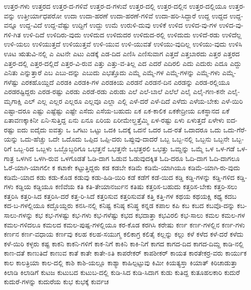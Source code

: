 {ಉತ್ತರ-ಗಳು
ಉತ್ತರದ
ಉತ್ತರ-ದ-ಗಳಿವೆ
ಉತ್ತರ-ದ-ಗಳುವೆ
ಉತ್ತರ-ದಲ್ಲಿ
ಉತ್ತರ-ದಲ್ಲಿನ
ಉತ್ತರ-ದಲ್ಲಿಯೂ
ಉತ್ತರ-ವನ್ನು
ಉತ್ತೀರ್ಯಾಧಪರೋ
ಉದಾ
ಉದಾ-ಹರಣೆ
ಉದಾ-ಹರಣೆ-ಗಳಿವೆ
ಉದಾ-ಹರಿ-ಸಿದ್ದಾರೆ
ಉದ್ದ
ಉದ್ದದ
ಉದ್ದ-ವನ್ನೂ
ಉದ್ದ-ವಿದೆ
ಉದ್ದ-ವೆಷ್ಟು
ಉದ್ದಿಗೆ
ಉದ್ದು
ಉಮೆ
ಉರುಳಿ-ದುವು
ಉಳಿಕೆ
ಉಳಿದ
ಉಳಿದ-ವು-ಗಳ
ಉಳಿದ-ವು-ಗಳಿ-ಗಿತ
ಉಳಿ-ದಿದೆ
ಉಳಿದಿರು-ವುದು
ಉಳಿದುದ
ಉಳಿದುದರ
ಉಳಿದುದ-ರಲ್ಲಿ
ಉಳಿದುದು
ಉಳಿದೆ-ರಡು
ಉಳಿದೆಲ್ಲ
ಉಳಿ-ಯಲು
ಉಳಿಯುತ್ತದೆ
ಉಳಿಯುತ್ತವೆ
ಉಳಿ-ಯುವ
ಉಳಿ-ಯುವತೆ
ಉಳಿಯು-ವುದಿಲ್ಲ
ಉಳಿಯು-ವುದು
ಉಳಿಸಿ
ಊಟ
ಋತುವಿ-ನಲ್ಲಿ
ಎ
ಎಟನೇ
ಎಟು
ಎಡಕ್ಕೆ
ಎಡ-ದಿದ
ಎಣಿಸಿ
ಎಣಿಸುವಾಗ
ಎತ್ತದೆ
ಎತ್ತಬಾರದು
ಎತ್ತರ
ಎತ್ತರದ
ಎತ್ತರ-ದಲ್ಲಿ
ಎತ್ತರ-ದಲ್ಲಿದೆ
ಎತ್ತರ-ವಿ-ರುವ
ಎತ್ತು
ಎತ್ತು-ವ-ತಿಲ್ಲ
ಎದ
ಎದರೆ
ಎದಿರಲಿ
ಎದು
ಎದುರು
ಎದೂ
ಎದ್ದು
ಎನಿತು
ಎನ್ನುತ್ತಾರೆ
ಎಬ
ಎಬು-ದನ್ನು
ಎಬುದು
ಎಭತ್ತೊದು
ಎಮ್ಮೆ
ಎಮ್ಮೆ-ಗಳ
ಎಮ್ಮೆ-ಗಳನ್ನು
ಎಮ್ಮೆ-ಗಳು
ಎಮ್ಮೆ-ಗಳೆಷ್ಟು
ಎರಕಹೊಯ್ದಿದೆ
ಎರಡಕಿ
ಎರಡಕಿ-ಗಳ
ಎರಡಕಿಯ
ಎರಡನೆ
ಎರಡನೆ-ದಿನ
ಎರಡನ್ನು
ಎರಡ-ರಲ್ಲಿಯೂ
ಎರಡರಷ್ಟಿದ್ದರು
ಎರಡ-ರಷ್ಟು
ಎರಡು
ಎರಡೆ-ರಡು
ಎರುಡು
ಎಲೆ
ಎಲೆ-ಬಾಲೆ
ಎಲೆಲೆ
ಎಲೈ
ಎಲೈ-ಗಣ-ಕನೇ
ಎಲೈ-ಮೃಗಾಕ್ಷಿ
ಎಲ್
ಎಲ್ಲ
ಎಲ್ಲರ
ಎಲ್ಲರೂ
ಎಲ್ಲವೂ
ಎಲ್ಲಾ
ಎಲ್ಲಿ
ಎಳೆ-ದರೆ
ಎಳೆ-ದಿದೆ
ಎಳೆದು
ಎಳೆಯ-ಬೇಕು
ಎಳೆ-ಯಿರಿ
ಎಷ್ಟಾ-ದರೂ
ಎಷ್ಟು
ಎಷ್ಟೆಷ್ಟು
ಎಷ್ಟೇ
ಎಸೆದು
ಎಸೆಯ-ಬಹುದು
ಏಕ
ಏಕ-ಕಾಲಿಕ
ಏಕಕೇದ್ರೀಯ
ಏಕಸ್ಥಾನದ
ಏಕೆ
ಏತಾವಣಕ್ಕಾಕಿನೀ
ಏನಿ-ಸುತ್ತಿದ್ದ
ಏನು
ಏನೂ
ಏರಿಯ
ಏರೀಮೇಲ್ಹತ್ತೆಮ್ಮಿ
ಏಳ-ರಷ್ಟು
ಏಳು
ಏಳುತ್ತದೆ
ಏಳೇಳು
ಐದ-ರಷ್ಟು
ಐದು
ಐದೈದು
ಐವತ್ತು
ಒ
ಒಗಟು
ಒಟ್ಟು
ಒದಕಿ
ಒದಕ್ಕೆ
ಒದನೆ
ಒದರ
ಒದ-ರತೆ
ಒದಾದರೂ
ಒದು
ಒದು-ಗೆರೆ-ಯನ್ನು
ಒದು-ಹೆಚ್ಚು
ಒದೇ
ಒದೊದು
ಒಪ್ಪಿದ
ಒಪ್ಪಿ-ದರು
ಒಪ್ಪುವು-ದಾದರೆ
ಒಬ್ಬ
ಒಬ್ಬ-ನಲ್ಲಿ
ಒಬ್ಬನು
ಒಬ್ಬನೇ
ಒಬ್ಬ-ರಿಗೆ
ಒಬ್ಬ-ರಿದ
ಒಬ್ಬಳು
ಒಬ್ಬೊಬ್ಬರಿಗೂ
ಒಭತ್ತನೆ
ಒಭತ್ತನೇ
ಒಭತ್ತರಲಿ
ಒಭತ್ತು
ಒಮ್ದನ್ನು
ಒಮ್ಮೆ
ಒಳ
ಒಳ-ಗಡೆ
ಒಳ-ಗಾತ್ರ
ಒಳಗಿನ
ಒಳಗಿ-ರುವ
ಒಳಗೊಡತೆ
ಓಡಿ-ದಾಗ
ಓಡುವ
ಓಡುವುದಕ್ಕಿತ
ಓದಿ-ದರೂ
ಓದಿ-ದಾಗ
ಓದಿ-ದಾಗಲೂ
ಓರೆ-ಯಾಗಿ-ಯಾಗಲೀ
ಕ
ಕಟಾಕೇ
ಕಟ್ಟುತ್ತಿದ್ದರು
ಕಡ
ಕಡಬೇ
ಕಡಿಮೆ
ಕಡಿಮೆ-ಯಾಗಿಯೂ
ಕಡಿಮೆ-ಯಾಗಿ-ರು-ವುದು
ಕಡಿಮೆ-ಯಾದ
ಕಡು
ಕಡು-ಕೊಡ
ಕಡುವು
ಕಡು-ಹಿಡಿ-ಯಿರಿ
ಕಡೆ
ಕಡೆಗೆ
ಕಡೆ-ಯಿದ
ಕಡ್ಡಿ
ಕಡ್ಡಿ-ಗಳನ್ನು
ಕಡ್ಡಿ-ಗಳಿದ
ಕಡ್ಡಿ-ಗಳು
ಕಡ್ಡಿಯ
ಕಡ್ಡಿಯೂ
ಕಣಿವೆಯ
ಕತಿ
ಕತಿ-ತೇಯಾನರ್ಜುನ
ಕತಿಷು
ಕತ್ತರಿಸ-ಬಹುದು
ಕತ್ತರಿಸ-ಬೇಕು
ಕತ್ತರಿ-ಸಲು
ಕತ್ತರಿಸಿ
ಕತ್ತರಿ-ಸಿದ
ಕತ್ತರಿಸಿ-ದರೆ
ಕತ್ತ-ರಿ-ಸಿದೆ
ಕತ್ತರಿಸುವ
ಕತ್ತರಿಸುವತೆ
ಕತ್ತಿ
ಕತ್ತಿ-ಗಳ
ಕಥಯ
ಕಥಯಕ್ಷಿ
ಕಥ್ಯ
ಕದಬ
ಕದ-ಬ-ಗಳಲ್ಲಿಯೂ
ಕದ್ದೊಯ್ದರು
ಕನಸಿ-ನಲ್ಲಿ
ಕನಿಷ್ಟ
ಕನಿಷ್ಠ
ಕನಿಷ್ಥ
ಕನ್ನಡ
ಕಪಾಲ
ಕಪಿ
ಕಬ
ಕಬದ
ಕಬವೊ-ದನ್ನು
ಕಬ-ಸಾಲು-ಗಳನ್ನು
ಕಭ
ಕಭ-ಗಳಷ್ಟು
ಕಭ-ಗಳು
ಕಭ-ಗಳೆಷ್ಟು
ಕಭದ
ಕಭದಾತ್ತಾ
ಕಭವಿರಲಿ
ಕಭ-ಸಾಲು
ಕಮಲ
ಕಮಲ-ಗಳ
ಕಮಲ-ಗಳಿದಲೂ
ಕಮಲದ
ಕಮಲ-ಪುಷ್ಪ-ಗಳಲ್ಲಿಯೂ
ಕರ-ಕೊಡ
ಕರಗಿಸಿ
ಕರೇಷು
ಕರ್ಣ
ಕರ್ಣ-ಗಳಲ್ಲಿನ
ಕರ್ಣ-ಗಳು
ಕರ್ಣನ
ಕರ್ಣ-ವಧಾಯ
ಕರ್ಣವು
ಕಲಹ
ಕಲಹ-ಸಯುಗ್ಮ
ಕಲಿಕಾಗ್ರ
ಕಲಿತೈ
ಕಲ್ಲನ್ನು
ಕಲ್ಲು
ಕಳೆ
ಕಳೆದ
ಕಳೆ-ದರೆ
ಕಳೆದು
ಕಳೆ-ಯಿರಿ
ಕಳ್ಳರು
ಕಷ್ಟ
ಕಾಕನಿ
ಕಾಕನಿ-ಗಳಿಗೆ
ಕಾಕ-ನಿಗೆ
ಕಾಕಿನಿ
ಕಾಕಿ-ನಿಗೆ
ಕಾಗದ
ಕಾಗದ-ದಿದ
ಕಾಗದ-ದಿಮ್ದ
ಕಾಡಿ-ನಲ್ಲಿ
ಕಾಣ-ದತೆ
ಕಾಣುತಿದೆ
ಕಾಣುವ
ಕಾತೆ
ಕಾತೇ
ಕಾತೇ-ಽತಿ
ಕಾಪರೇಕರ್
ಕಾಪಶೀಕರ್
ಕಾಯತ
ಕಾರತೇಕರ್ರ-ವರು
ಕಾರ್ಯುಕ
ಕಾಲ
ಕಾಲತ್ರಿಯಾ
ಕಾಲ-ದಲ್ಲಿ
ಕಾಶಿ
ಕಾಶಿ-ಯಲ್ಲೂ
ಕಾಶ್ಯಾ
ಕಾಹಿಲ್ಪಟ್ಟುವು
ಕಿಮೀ
ಕಿಯತ್ಯಸ್ತಾ
ಕಿಯಾತ್
ಕಿರಿಚಾಡುತ್ತಾ
ಕಿಲಾಡಿ
ಕಿಲಾಡಿಗೆ
ಕುಟಜ
ಕುಟುಬದ
ಕುಟುಬ-ದಲ್ಲಿ
ಕುಡಿ-ಸಿದ
ಕುಡಿ-ಸಿದಾಗ
ಕುಡು
ಕುತಿದ್ದ
ಕುತೂಹಲಕಾರಿ
ಕುದುರೆ
ಕುದುರೆ-ಗಳನ್ನು
ಕುದುರೆಯ
ಕುಭ
ಕುಭಕ್ಕೆ
ಕುರ್ವಚ
}
